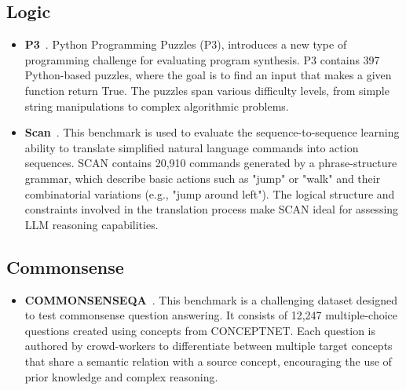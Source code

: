 \subsection{Logic}
\begin{itemize}
    \item \textbf{P3}~\cite{schuster2021programming}. Python Programming Puzzles (P3), introduces a new type of programming challenge for evaluating program synthesis. P3 contains 397 Python-based puzzles, where the goal is to find an input that makes a given function return True. The puzzles span various difficulty levels, from simple string manipulations to complex algorithmic problems. 
    \item \textbf{Scan}~\cite{lake2018generalization}. This benchmark is used to evaluate the sequence-to-sequence learning ability to translate simplified natural language commands into action sequences. SCAN contains 20,910 commands generated by a phrase-structure grammar, which describe basic actions such as "jump" or "walk" and their combinatorial variations (e.g., "jump around left"). The logical structure and constraints involved in the translation process make SCAN ideal for assessing LLM reasoning capabilities.
\end{itemize}

\vspace{-2mm}
\subsection{Commonsense}
\begin{itemize}
    \item \textbf{COMMONSENSEQA}~\cite{talmor2018commonsenseqa}. This benchmark is a challenging dataset designed to test commonsense question answering. It consists of 12,247 multiple-choice questions created using concepts from CONCEPTNET. Each question is authored by crowd-workers to differentiate between multiple target concepts that share a semantic relation with a source concept, encouraging the use of prior knowledge and complex reasoning. 
\end{itemize}

\vspace{-2mm}

